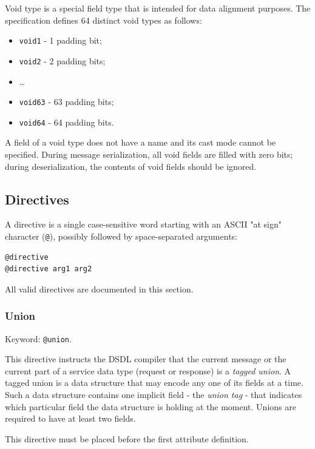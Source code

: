 Void type is a special field type that is intended for data alignment purposes.
The specification defines 64 distinct void types as follows:

\begin{itemize}
    \item \verb|void1| - 1 padding bit;
    \item \verb|void2| - 2 padding bits;
    \item \ldots
    \item \verb|void63| - 63 padding bits;
    \item \verb|void64| - 64 padding bits.
\end{itemize}

A field of a void type does not have a name and its cast mode cannot be specified.
During message serialization, all void fields are filled with zero bits;
during deserialization, the contents of void fields should be ignored.

\subsection{Directives}\label{sec:dsdl_directives}

A directive is a single case-sensitive word starting with an ASCII "at sign" character (\verb|@|),
possibly followed by space-separated arguments:

\begin{verbatim}
@directive
@directive arg1 arg2
\end{verbatim}

All valid directives are documented in this section.

\subsubsection{Union}

Keyword: \verb|@union|.

This directive instructs the DSDL compiler that the current message or the current part of a service data type
(request or response) is a \emph{tagged union}.
A tagged union is a data structure that may encode any one of its fields at a time.
Such a data structure contains one implicit field - the \emph{union tag} - that indicates which particular
field the data structure is holding at the moment.
Unions are required to have at least two fields.

This directive must be placed before the first attribute definition.

